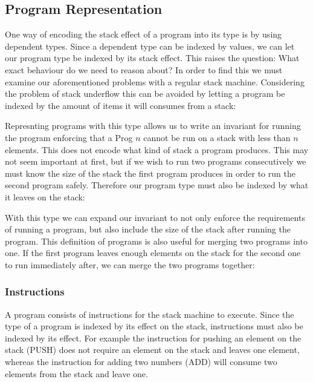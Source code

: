 \subsection{Program Representation}
One way of encoding the stack effect of a program into its type is by using dependent types. Since a dependent type can be indexed by values, we can let our program type be indexed by its stack effect. This raises the question: What exact behaviour do we need to reason about? In order to find this we must examine our aforementioned problems with a regular stack machine. Considering the problem of stack underflow this can be avoided by letting a program be indexed by the amount of items it will consumes from a stack:

\begin{prooftree}
\end{prooftree}

Represnting programs with this type allows us to write an invariant for running the program enforcing that a Prog $n$ cannot be run on a stack with less than $n$ elements. This does not encode what kind of stack a program produces. This may not seem important at first, but if we wish to run two programs consecutively we must know the size of the stack the first program produces in order to run the second program safely. Therefore our program type must also be indexed by what it leaves on the stack:

\begin{prooftree}
\end{prooftree}

With this type we can expand our invariant to not only enforce the requirements of running a program, but also include the size of the stack after running the program. This definition of programs is also useful for merging two programs into one. If the first program leaves enough elements on the stack for the second one to run immediately after, we can merge the two programs together:

\begin{prooftree}
\end{prooftree}

\subsubsection{Instructions}
A program consists of instructions for the stack machine to execute. Since the type of a program is indexed by its effect on the stack, instructions must also be indexed by its effect. For example the instruction for pushing an element on the stack (PUSH) does not require an element on the stack and leaves one element, whereas the instruction for adding two numbers (ADD) will consume two elements from the stack and leave one. 

